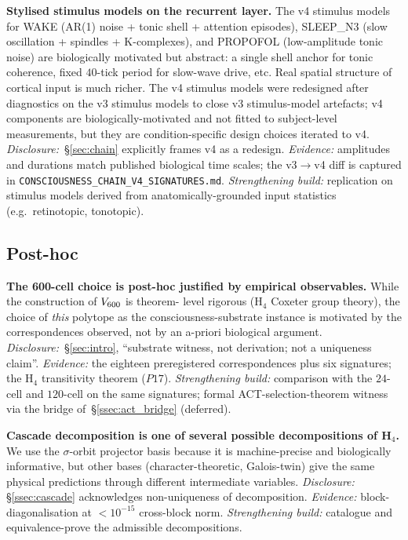 \textbf{Stylised stimulus models on the recurrent layer.} The v4
stimulus models for WAKE (AR(1) noise + tonic shell + attention
episodes), SLEEP\_N3 (slow oscillation + spindles + K-complexes),
and PROPOFOL (low-amplitude tonic noise) are biologically motivated
but abstract: a single shell anchor for tonic coherence, fixed
$40$-tick period for slow-wave drive, etc. Real spatial structure of
cortical input is much richer. The v4 stimulus models were redesigned
after diagnostics on the v3 stimulus models to close v3 stimulus-model
artefacts; v4 components are biologically-motivated and not fitted
to subject-level measurements, but they are condition-specific
design choices iterated to v4. \emph{Disclosure:}~\S\ref{sec:chain}
explicitly frames v4 as a redesign. \emph{Evidence:} amplitudes and
durations match published biological time scales; the v3$\to$v4
diff is captured in
\texttt{CONSCIOUSNESS\_CHAIN\_V4\_SIGNATURES.md}. \emph{Strengthening
build:} replication on stimulus models derived from anatomically-grounded
input statistics (e.g.\ retinotopic, tonotopic).

\subsection{Post-hoc}\label{ssec:posthoc}

\textbf{The 600-cell choice is post-hoc justified by empirical
observables.} While the construction of $V_{600}$ is theorem-
level rigorous (H$_4$ Coxeter group theory), the choice of \emph{this}
polytope as the consciousness-substrate instance is motivated by the
correspondences observed, not by an a-priori biological argument.
\emph{Disclosure:}~\S\ref{sec:intro}, ``substrate witness, not
derivation; not a uniqueness claim''. \emph{Evidence:} the eighteen
preregistered correspondences plus six signatures; the H$_4$
transitivity theorem ($P17$). \emph{Strengthening build:} comparison
with the $24$-cell and $120$-cell on the same signatures; formal
ACT-selection-theorem witness via the bridge of~\S\ref{ssec:act_bridge}
(deferred).

\textbf{Cascade decomposition is one of several possible
decompositions of H$_4$.} We use the $\sigma$-orbit projector basis
because it is machine-precise and biologically informative, but other
bases (character-theoretic, Galois-twin) give the same physical
predictions through different intermediate variables. \emph{Disclosure:}
\S\ref{ssec:cascade} acknowledges non-uniqueness of decomposition.
\emph{Evidence:} block-diagonalisation at $<10^{-15}$ cross-block
norm. \emph{Strengthening build:} catalogue and equivalence-prove the
admissible decompositions.

